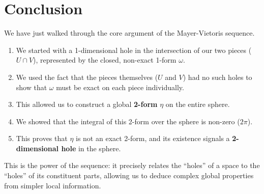 \documentclass[12pt, letterpaper]{article}
\begin{document}
	\section{Conclusion}
	We have just walked through the core argument of the Mayer-Vietoris sequence.
	\begin{enumerate}
		\item We started with a 1-dimensional hole in the intersection of our two pieces ($U \cap V$), represented by the closed, non-exact 1-form $\omega$.
		\item We used the fact that the pieces themselves ($U$ and $V$) had no such holes to show that $\omega$ must be exact on each piece individually.
		\item This allowed us to construct a global \textbf{2-form} $\eta$ on the entire sphere.
		\item We showed that the integral of this 2-form over the sphere is non-zero ($2\pi$).
		\item This proves that $\eta$ is not an exact 2-form, and its existence signals a \textbf{2-dimensional hole} in the sphere.
	\end{enumerate}
	This is the power of the sequence: it precisely relates the ``holes'' of a space to the ``holes'' of its constituent parts, allowing us to deduce complex global properties from simpler local information.
	
\end{document}

